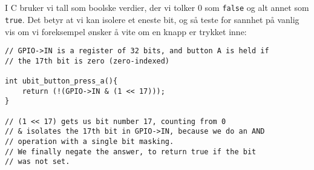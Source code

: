\documentclass[11pt,a4paper]{article}
\begin{document}
\\
\\
I C bruker vi tall som boolske verdier, der vi tolker 0 som \texttt{false} og alt annet som \texttt{true}. Det betyr at vi kan isolere et eneste bit, og så teste for sannhet på vanlig vis om vi foreksempel ønsker å vite om en knapp er trykket inne:
\begin{verbatim}
// GPIO->IN is a register of 32 bits, and button A is held if
// the 17th bit is zero (zero-indexed)

int ubit_button_press_a(){
	return (!(GPIO->IN & (1 << 17)));
}

// (1 << 17) gets us bit number 17, counting from 0
// & isolates the 17th bit in GPIO->IN, because we do an AND
// operation with a single bit masking.
// We finally negate the answer, to return true if the bit
// was not set.
\end{verbatim} 
\end{document}
